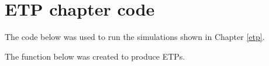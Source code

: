 

\section{ETP chapter code}

The code below was used to run the simulations shown in Chapter \ref{etp}.




The function below was created to produce ETPs. 

